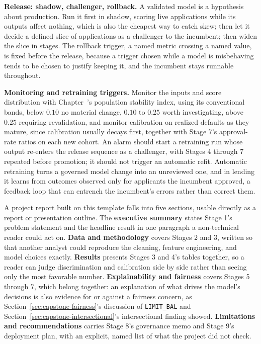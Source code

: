 \documentclass[../ai_in_finance]{subfiles}
\begin{document}
\textbf{Release: shadow, challenger, rollback.} A validated model is a hypothesis about production. Run it first in shadow, scoring live applications while its outputs affect nothing, which is also the cheapest way to catch skew; then let it decide a defined slice of applications as a challenger to the incumbent; then widen the slice in stages. The rollback trigger, a named metric crossing a named value, is fixed before the release, because a trigger chosen while a model is misbehaving tends to be chosen to justify keeping it, and the incumbent stays runnable throughout.

\textbf{Monitoring and retraining triggers.} Monitor the inputs and score distribution with Chapter~'s population stability index, using its conventional bands, below $0.10$ no material change, $0.10$ to $0.25$ worth investigating, above $0.25$ requiring revalidation, and monitor calibration on realized defaults as they mature, since calibration usually decays first, together with Stage 7's approval-rate ratios on each new cohort. An alarm should start a retraining run whose output re-enters the release sequence as a challenger, with Stages 4 through 7 repeated before promotion; it should not trigger an automatic refit. Automatic retraining turns a governed model change into an unreviewed one, and in lending it learns from outcomes observed only for applicants the incumbent approved, a feedback loop that can entrench the incumbent's errors rather than correct them.

A project report built on this template falls into five sections, usable directly as a report or presentation outline. The \textbf{executive summary} states Stage 1's problem statement and the headline result in one paragraph a non-technical reader could act on. \textbf{Data and methodology} covers Stages 2 and 3, written so that another analyst could reproduce the cleaning, feature engineering, and model choices exactly. \textbf{Results} presents Stages 3 and 4's tables together, so a reader can judge discrimination and calibration side by side rather than seeing only the most favorable number. \textbf{Explainability and fairness} covers Stages 5 through 7, which belong together: an explanation of what drives the model's decisions is also evidence for or against a fairness concern, as Section~\ref{sec:capstone-fairness}'s discussion of \texttt{LIMIT\_BAL} and Section~\ref{sec:capstone-intersectional}'s intersectional finding showed. \textbf{Limitations and recommendations} carries Stage 8's governance memo and Stage 9's deployment plan, with an explicit, named list of what the project did not check.
\end{document}
